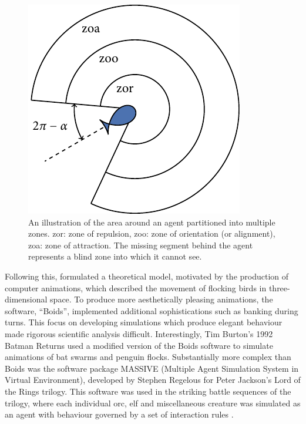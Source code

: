 \begin{figure}[t]
	\includegraphics{zonal_tikz.pdf}
	\caption{An illustration of the area around an agent partitioned into multiple zones. zor: zone of repulsion, zoo: zone of orientation (or alignment), zoa: zone of attraction. The missing segment behind the agent represents a blind zone into which it cannot see.}
	\label{fig:zone_illustration}
\end{figure}

Following this, \textcite{reynolds87} formulated a theoretical model, motivated by the production of computer animations, which described the movement of flocking birds in three-dimensional space. To produce more aesthetically pleasing animations, the software, ``Boids'', implemented additional sophistications such as banking during turns. This focus on developing simulations which produce elegant behaviour made rigorous scientific analysis difficult. Interestingly, Tim Burton's 1992 Batman Returns used a modified version of the Boids software to simulate animations of bat swarms and penguin flocks. Substantially more complex than Boids was the software package MASSIVE (Multiple Agent Simulation System in Virtual Environment), developed by Stephen Regelous for Peter Jackson's Lord of the Rings trilogy. This software was used in the striking battle sequences of the trilogy, where each individual orc, elf and miscellaneous creature was simulated as an agent with behaviour governed by a set of interaction rules \parencite{robbins17}.

